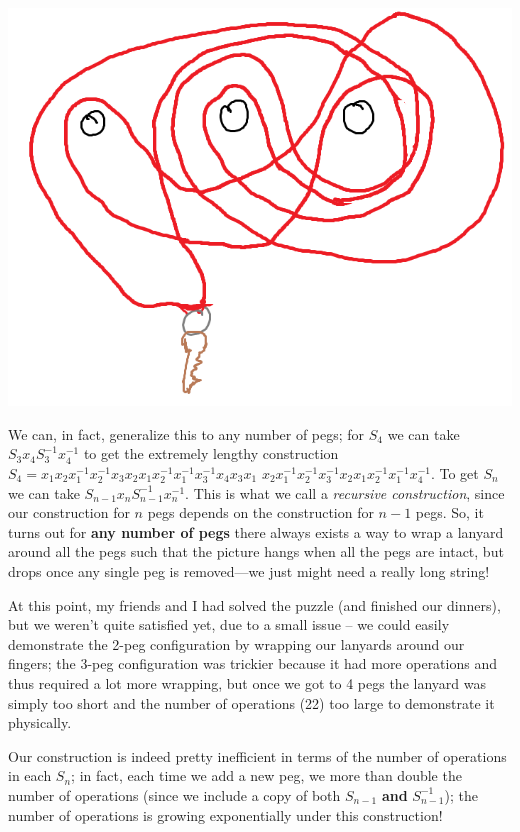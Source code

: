 \documentclass{article}
\begin{document}
\begin{center}
    \includegraphics[scale = 0.4]{images/lanyard71.png}
\end{center}

We can, in fact, generalize this to any number of pegs; for $S_4$ we can take $S_3x_4S_3^{-1}x_4^{-1}$ to get the extremely lengthy construction
$S_4=x_1x_2x_1^{-1}x_2^{-1}x_3x_2x_1x_2^{-1}x_1^{-1}x_3^{-1}x_4x_3x_1$ $x_2x_1^{-1}x_2^{-1}x_3^{-1}x_2x_1x_2^{-1}x_1^{-1}x_4^{-1}$. To get $S_n$ we can take $S_{n-1}x_nS_{n-1}^{-1}x_n^{-1}$. This is what we call a \textit{recursive construction}, since our construction for $n$ pegs depends on the construction for $n-1$ pegs. 
So, it turns out for \textbf{any number of pegs} there always exists a way to wrap a lanyard around all the pegs such that the picture hangs when all the pegs are intact, but drops once any single peg is removed---we just might need a really long string!

At this point, my friends and I had solved the puzzle (and finished our dinners), but we weren’t quite satisfied yet, due to a small issue -- we could easily demonstrate the 2-peg configuration by wrapping our lanyards around our fingers; the 3-peg configuration was trickier because it had more operations and thus required a lot more wrapping, but once we got to 4 pegs the lanyard was simply too short and the number of operations (22) too large to demonstrate it physically.

Our construction is indeed pretty inefficient in terms of the number of operations in each $S_n$; in fact, each time we add a new peg, we more than double the number of operations (since we include a copy of both $S_{n-1}$ \textbf{and} $S_{n-1}^{-1}$); the number of operations is growing exponentially under this construction!
\end{document}
